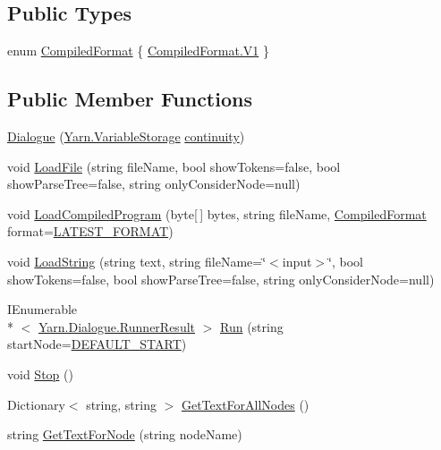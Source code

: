 \subsection*{Public Types}
\begin{DoxyCompactItemize}
\item 
enum \hyperlink{a00070_a903f18cdcc66c28ceab5a43c41fe074d}{Compiled\-Format} \{ \hyperlink{a00070_a903f18cdcc66c28ceab5a43c41fe074dab4daca084ad9eabfc8de231929477ed6}{Compiled\-Format.\-V1}
 \}
\end{DoxyCompactItemize}
\subsection*{Public Member Functions}
\begin{DoxyCompactItemize}
\item 
\hyperlink{a00070_a349debf4c4b8d48e3d80ff31ad380b0e}{Dialogue} (\hyperlink{a00164}{Yarn.\-Variable\-Storage} \hyperlink{a00070_ae94eaa4b03b432422f5d205fabe37ff5}{continuity})
\item 
void \hyperlink{a00070_af868f7f6928d122ca1d1857be433d92b}{Load\-File} (string file\-Name, bool show\-Tokens=false, bool show\-Parse\-Tree=false, string only\-Consider\-Node=null)
\item 
void \hyperlink{a00070_a4bc1ceca26754dc3ec0a2281dfee26ce}{Load\-Compiled\-Program} (byte\mbox{[}$\,$\mbox{]} bytes, string file\-Name, \hyperlink{a00070_a903f18cdcc66c28ceab5a43c41fe074d}{Compiled\-Format} format=\hyperlink{a00070_a3bc83587462ade6a2f7f42cb7576e50e}{L\-A\-T\-E\-S\-T\-\_\-\-F\-O\-R\-M\-A\-T})
\item 
void \hyperlink{a00070_a7b66187877ec8a2bfee2298d3dd16706}{Load\-String} (string text, string file\-Name=\char`\"{}$<$input$>$\char`\"{}, bool show\-Tokens=false, bool show\-Parse\-Tree=false, string only\-Consider\-Node=null)
\item 
I\-Enumerable\\*
$<$ \hyperlink{a00130}{Yarn.\-Dialogue.\-Runner\-Result} $>$ \hyperlink{a00070_aead84ee50cb113ca45724894290ce9c2}{Run} (string start\-Node=\hyperlink{a00070_a1b643f15f734090e6a58cbf13dafd28f}{D\-E\-F\-A\-U\-L\-T\-\_\-\-S\-T\-A\-R\-T})
\item 
void \hyperlink{a00070_a7a6cabe5612fdcdc4619460431f85112}{Stop} ()
\item 
Dictionary$<$ string, string $>$ \hyperlink{a00070_a7c83b1fe5474a6610d39eb525f6fc9ce}{Get\-Text\-For\-All\-Nodes} ()
\item 
string \hyperlink{a00070_a594641914a2b59cc5231645273d18e82}{Get\-Text\-For\-Node} (string node\-Name)

\end{DoxyCompactItemize}
